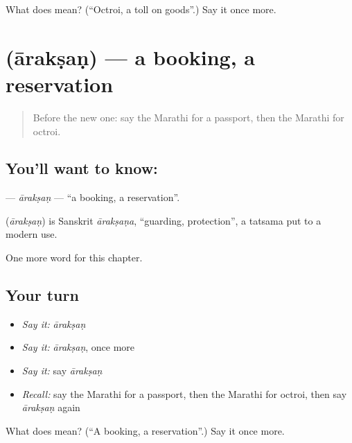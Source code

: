 \begin{tcolorbox}[breakable,colback=teal!4,colframe=teal!35!black,title={Before you move on}]
What does  mean? (\textquotedblleft{}Octroi, a toll on goods\textquotedblright{}.) Say it once more.
\end{tcolorbox}
\section[\texorpdfstring{\mr{आरक्षण} (ārakṣaṇ)}{आरक्षण (ārakṣaṇ)}]{ (ārakṣaṇ) — a booking, a reservation}

\label{lesson:MR-C236-araksan}



\begin{quote}
Before the new one: say the Marathi for a passport, then the Marathi for octroi.
\end{quote}

\subsection*{You'll want to know: }
\textbf{} — \emph{ārakṣaṇ} — \textquotedblleft{}a booking, a reservation\textquotedblright{}.

\begin{cousinweb}
\textbf{} (\emph{ārakṣaṇ}) is Sanskrit \emph{ārakṣaṇa}, \textquotedblleft{}guarding, protection\textquotedblright{}, a tatsama put to a modern use.
\end{cousinweb}

\begin{grammarlens}[title={What you've built}]
One more word for this chapter.
\end{grammarlens}

\subsection*{Your turn}
\begin{itemize}
\raggedright
  \item \emph{Say it:} \emph{ārakṣaṇ}
  \item \emph{Say it:} \emph{ārakṣaṇ}, once more
  \item \emph{Say it:} say \emph{ārakṣaṇ}
  \item \emph{Recall:} say the Marathi for a passport, then the Marathi for octroi, then say \emph{ārakṣaṇ} again
\end{itemize}

\begin{tcolorbox}[breakable,colback=teal!4,colframe=teal!35!black,title={Before you move on}]
What does  mean? (\textquotedblleft{}A booking, a reservation\textquotedblright{}.) Say it once more.
\end{tcolorbox}
